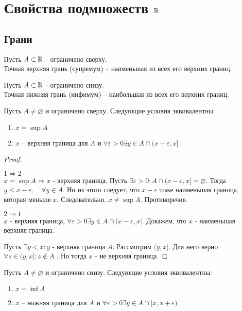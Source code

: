 \documentclass[12pt]{report}
\begin{document}
\section{Свойства подмножеств $\mathbb{R}$}
\subsection{Грани}\label{ques_7}
\begin{defn}[supremum]
    Пусть $A \subset \mathbb{R}$ - ограничено сверху. \\
    Точная верхняя грань (супремум) -- наименьшая из всех его верхних границ.
\end{defn}
\begin{defn}[infimum]
    Пусть $A \subset \mathbb{R}$ - ограничено снизу. \\
    Точная нижняя грань (инфимум) -- наибольшая из всех его верхних границ.
\end{defn}
\begin{thm}
    Пусть $A \ne \varnothing$ и ограничено сверху. Следующие условия эквивалентны:
    \begin{enumerate}
        \item $x = \sup A$
	\item $x$ -- верхняя граница для $A$ и $\forall \varepsilon >0 \exists y \in A \cap (x - \varepsilon , x]$
    \end{enumerate}
\end{thm}
\begin{proof}$ $
    \begin{description}
	\item $1 \Rightarrow 2$\\
	    $x = \sup A \Rightarrow x $ - верхняя граница. Пусть $\exists \varepsilon >0: A \cap (x-\varepsilon , x] = \varnothing$. Тогда $y \le x - \varepsilon , \quad \forall y \in A$.
	    Но из этого следует, что $x-\varepsilon $ тоже наименьшая граница, которая меньше $x$. Следовательно, $x \ne \sup A$. Противоречие.
	\item $2 \Rightarrow 1$ \\
	        $x$ - верхняя граница, $\forall \varepsilon >0 \exists y \in  A \cap (x-\varepsilon , x]$. Докажем, что $x$ - наименьшая верхняя граница.
    \end{description}
    Пусть $\exists y < x: y$  - верхняя граница $A$. Рассмотрим $(y, x]$. Для него верно $\forall z \in (y, x]: z \notin A$ . Но тогда $x$ - не верхняя граница.
\end{proof}
\begin{thm}
    Пусть $A \ne \varnothing$ и ограничено снизу. Следующие условия эквивалентны:
    \begin{enumerate}
        \item $x = \inf  A$
	\item $x$ -- нижняя граница для $A$ и $\forall \varepsilon >0 \exists y \in A \cap [x, x+ \varepsilon)$
    \end{enumerate}
\end{thm}
\end{document}
